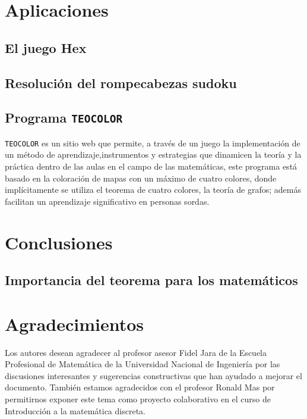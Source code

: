 \documentclass[3p,times,a4paper,twocolumn,authoryear]{elsarticle} %
\begin{document}
\section{Aplicaciones}\label{sec:3.}

\subsection{El juego Hex}\label{sec:3.1}

\subsection{Resolución del rompecabezas sudoku}\label{sec:3.2}

\subsection{Programa \texttt{TEOCOLOR}}

\texttt{TEOCOLOR} es un sitio web que permite, a través de un juego la implementación de un método de aprendizaje,instrumentos y estrategias que dinamicen la teoría y la práctica dentro de las aulas en el campo de las matemáticas, este programa está basado en la coloración de mapas con un máximo de
cuatro colores, donde implícitamente se utiliza el teorema de cuatro colores, la teoría de grafos; además facilitan un aprendizaje significativo en personas sordas.

\section{Conclusiones}\label{sec:4}

\subsection{Importancia del teorema para los matemáticos}\label{sec:4.1}

\section*{Agradecimientos}

Los autores desean agradecer al profesor asesor \linebreak Fidel Jara de la Escuela Profesional de Matemática de la Universidad Nacional de Ingeniería por las  discusiones interesantes y sugerencias constructivas que han ayudado a mejorar el documento. También estamos agradecidos con el profesor Ronald Mas por permitirnos exponer este tema como proyecto colaborativo en el curso de Introducción a la matemática discreta.

\nocite{*}
\printbibliography[title={Referencias bibliográficas}]
\end{document}
